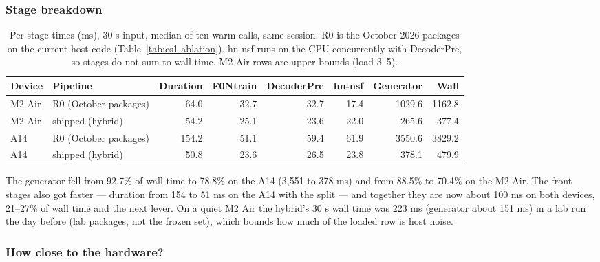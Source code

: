 \documentclass[11pt]{article}
\begin{document}
\subsubsection{Stage breakdown}\label{sec:cs1-stages}

\begin{table}[h]
\centering
\small
\caption{Per-stage times (ms), 30 s input, median of ten warm calls, same session. R0 is the October 2026 packages on the current host code (Table~\ref{tab:cs1-ablation}). hn-nsf runs on the CPU concurrently with DecoderPre, so stages do not sum to wall time. M2 Air rows are upper bounds (load 3--5).}
\label{tab:cs1-stages}
\begin{tabular}{llrrrrrr}
\toprule
Device & Pipeline & Duration & F0Ntrain & DecoderPre & hn-nsf & Generator & Wall \\
\midrule
M2 Air & R0 (October packages) & 64.0 & 32.7 & 32.7 & 17.4 & 1029.6 & 1162.8 \\
M2 Air & shipped (hybrid) & 54.2 & 25.1 & 23.6 & 22.0 & 265.6 & 377.4 \\
A14 & R0 (October packages) & 154.2 & 51.1 & 59.4 & 61.9 & 3550.6 & 3829.2 \\
A14 & shipped (hybrid) & 50.8 & 23.6 & 26.5 & 23.8 & 378.1 & 479.9 \\
\bottomrule
\end{tabular}
\end{table}

The generator fell from 92.7\% of wall time to 78.8\% on the A14 (3,551 to 378 ms) and from 88.5\% to 70.4\% on the M2 Air. The front stages also got faster --- duration from 154 to 51 ms on the A14 with the split --- and together they are now about 100 ms on both devices, 21--27\% of wall time and the next lever. On a quiet M2 Air the hybrid's 30 s wall time was 223 ms (generator about 151 ms) in a lab run the day before (lab packages, not the frozen set), which bounds how much of the loaded row is host noise.

\subsubsection{How close to the hardware?}\label{sec:cs1-ceiling}
\end{document}
